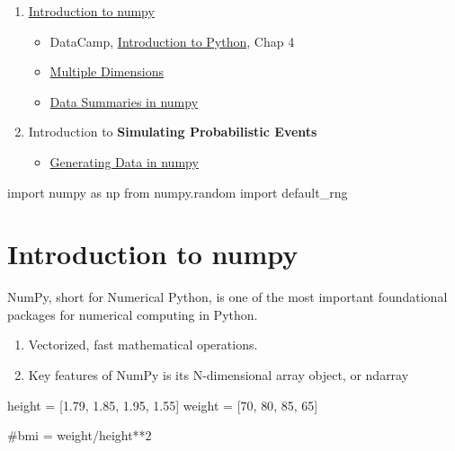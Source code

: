 \documentclass[
  letterpaper,
  DIV=11,
  numbers=noendperiod]{scrreprt}
\newenvironment{Shaded}{\begin{snugshade}}{\end{snugshade}}
\newcommand{\CommentTok}[1]{\textcolor[rgb]{0.37,0.37,0.37}{#1}}
\newcommand{\DecValTok}[1]{\textcolor[rgb]{0.68,0.00,0.00}{#1}}
\newcommand{\FloatTok}[1]{\textcolor[rgb]{0.68,0.00,0.00}{#1}}
\newcommand{\ImportTok}[1]{\textcolor[rgb]{0.00,0.46,0.62}{#1}}
\newcommand{\NormalTok}[1]{\textcolor[rgb]{0.00,0.23,0.31}{#1}}
\newcommand{\OperatorTok}[1]{\textcolor[rgb]{0.37,0.37,0.37}{#1}}
\providecommand{\tightlist}{%
  \setlength{\itemsep}{0pt}\setlength{\parskip}{0pt}}\usepackage{longtable,booktabs,array}
\begin{document}
\begin{enumerate}
\def\labelenumi{\arabic{enumi}.}
\tightlist
\item
  \protect\hyperlink{Introduction-to-numpy}{Introduction to numpy}

  \begin{itemize}
  \tightlist
  \item
    DataCamp,
    \href{https://app.datacamp.com/learn/courses/intro-to-python-for-data-science}{Introduction
    to Python}, Chap 4
  \item
    \protect\hyperlink{Multiple-Dimensions}{Multiple Dimensions}
  \item
    \protect\hyperlink{Data-Summaries-in-numpy}{Data Summaries in numpy}
  \end{itemize}
\item
  Introduction to \textbf{Simulating Probabilistic Events}

  \begin{itemize}
  \tightlist
  \item
    \protect\hyperlink{Generating-Data-in-numpy}{Generating Data in
    numpy}
  \end{itemize}
\end{enumerate}

\begin{Shaded}
\begin{Highlighting}[]
\ImportTok{import}\NormalTok{ numpy }\ImportTok{as}\NormalTok{ np}
\ImportTok{from}\NormalTok{ numpy.random }\ImportTok{import}\NormalTok{ default\_rng}
\end{Highlighting}
\end{Shaded}

\hypertarget{introduction-to-numpy-1}{%
\section{Introduction to numpy}\label{introduction-to-numpy-1}}

NumPy, short for Numerical Python, is one of the most important
foundational packages for numerical computing in Python.

\begin{enumerate}
\def\labelenumi{\arabic{enumi}.}
\tightlist
\item
  Vectorized, fast mathematical operations.
\item
  Key features of NumPy is its N-dimensional array object, or ndarray
\end{enumerate}

\begin{Shaded}
\begin{Highlighting}[]
\NormalTok{height }\OperatorTok{=}\NormalTok{ [}\FloatTok{1.79}\NormalTok{, }\FloatTok{1.85}\NormalTok{, }\FloatTok{1.95}\NormalTok{, }\FloatTok{1.55}\NormalTok{]}
\NormalTok{weight }\OperatorTok{=}\NormalTok{ [}\DecValTok{70}\NormalTok{, }\DecValTok{80}\NormalTok{, }\DecValTok{85}\NormalTok{, }\DecValTok{65}\NormalTok{]}

\CommentTok{\#bmi = weight/height**2}
\end{Highlighting}
\end{Shaded}
\end{document}
